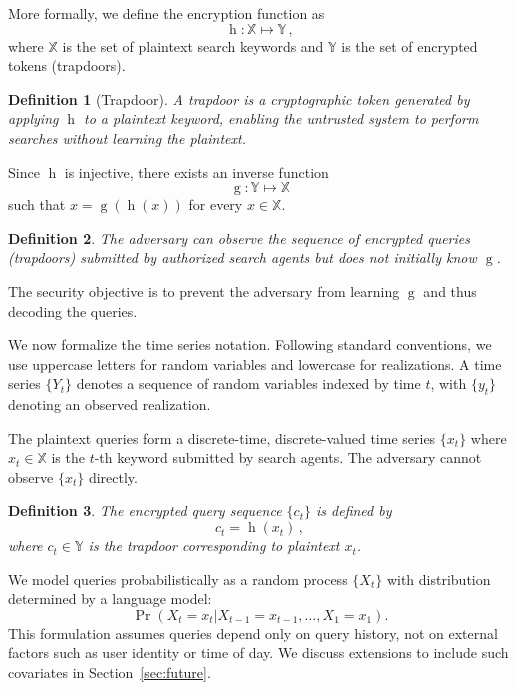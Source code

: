 \documentclass[final,11pt]{article}
\newcommand{\set}[1]{\mathbb{#1}}
\theoremstyle{plain}
\newtheorem{definition}{Definition}
\theoremstyle{remark}
\begin{document}
More formally, we define the encryption function as
\begin{equation}
    \operatorname{h} \colon \set{X} \mapsto \set{Y}\,,
\end{equation}
where $\set{X}$ is the set of plaintext search keywords and $\set{Y}$ is
the set of encrypted tokens (trapdoors).

\begin{definition}[Trapdoor]
A trapdoor is a cryptographic token generated by applying $\operatorname{h}$
to a plaintext keyword, enabling the untrusted system to perform searches
without learning the plaintext.
\end{definition}

Since $\operatorname{h}$ is injective, there exists an inverse function
\begin{equation}
    \operatorname{g} \colon \set{Y} \mapsto \set{X}
\end{equation}
such that $x = \operatorname{g}(\operatorname{h}(x))$ for every $x \in \set{X}$.

\begin{definition}
The adversary can observe the sequence of encrypted queries (trapdoors)
submitted by authorized search agents but does not initially know
$\operatorname{g}$.
\end{definition}

The security objective is to prevent the adversary from learning
$\operatorname{g}$ and thus decoding the queries.

We now formalize the time series notation. Following standard conventions,
we use uppercase letters for random variables and lowercase for realizations.
A time series $\{Y_t\}$ denotes a sequence of random variables indexed by
time $t$, with $\{y_t\}$ denoting an observed realization.

The plaintext queries form a discrete-time, discrete-valued time series
$\{x_t\}$ where $x_t \in \set{X}$ is the $t$-th keyword submitted by search
agents. The adversary cannot observe $\{x_t\}$ directly.

\begin{definition}
The encrypted query sequence $\{c_t\}$ is defined by
$$
  c_t = \operatorname{h}(x_t)\,,
$$
where $c_t \in \set{Y}$ is the trapdoor corresponding to plaintext $x_t$.
\end{definition}

We model queries probabilistically as a random process $\{X_t\}$ with
distribution determined by a language model:
\begin{equation}
    \Pr(X_t = x_t | X_{t-1} = x_{t-1},\ldots,X_1 = x_1).
\end{equation}
This formulation assumes queries depend only on query history, not on
external factors such as user identity or time of day. We discuss
extensions to include such covariates in Section~\ref{sec:future}.
\end{document}
